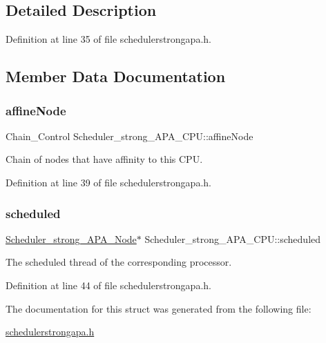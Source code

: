 \subsection{Detailed Description}


Definition at line 35 of file schedulerstrongapa.\+h.



\subsection{Member Data Documentation}
\mbox{\label{structScheduler__strong__APA__CPU_adf4eebd8db4f5b52fdfe7b352c8bddc7}} 
\subsubsection{\texorpdfstring{affine\+Node}{affineNode}}
{\footnotesize\ttfamily Chain\+\_\+\+Control Scheduler\+\_\+strong\+\_\+\+A\+P\+A\+\_\+\+C\+P\+U\+::affine\+Node}



Chain of nodes that have affinity to this C\+PU. 



Definition at line 39 of file schedulerstrongapa.\+h.

\mbox{\label{structScheduler__strong__APA__CPU_aa2f3c81477c08ef4188e5e24f054dffb}} 
\subsubsection{\texorpdfstring{scheduled}{scheduled}}
{\footnotesize\ttfamily \hyperlink{structScheduler__strong__APA__Node}{Scheduler\+\_\+strong\+\_\+\+A\+P\+A\+\_\+\+Node}$\ast$ Scheduler\+\_\+strong\+\_\+\+A\+P\+A\+\_\+\+C\+P\+U\+::scheduled}



The scheduled thread of the corresponding processor. 



Definition at line 44 of file schedulerstrongapa.\+h.



The documentation for this struct was generated from the following file\+:\begin{DoxyCompactItemize}
\item 
\hyperlink{schedulerstrongapa_8h}{schedulerstrongapa.\+h}\end{DoxyCompactItemize}
